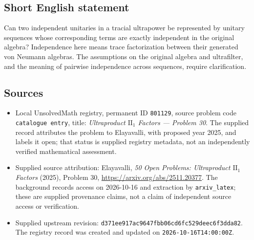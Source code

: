 \documentclass[11pt]{article}
\begin{document}
\subsection{Short English statement}
Can two independent unitaries in a tracial ultrapower be represented by unitary sequences whose corresponding terms are exactly independent in the original algebra? Independence here means trace factorization between their generated von Neumann algebras. The assumptions on the original algebra and ultrafilter, and the meaning of pairwise independence across sequences, require clarification.
\subsection{Sources}
\begin{itemize}
\item Local UnsolvedMath registry, permanent ID \texttt{801129}, source problem code \texttt{catalogue entry}, title: \emph{Ultraproduct $\mathrm{II}_1$ Factors --- Problem 30}. The supplied record attributes the problem to Elayavalli, with proposed year 2025, and labels it open; that status is supplied registry metadata, not an independently verified mathematical assessment.
\item Supplied source attribution: Elayavalli, \emph{50 Open Problems: Ultraproduct $\mathrm{II}_1$ Factors} (2025), Problem 30, \url{https://arxiv.org/abs/2511.20377}. The background records access on 2026-10-16 and extraction by \texttt{arxiv\_latex}; these are supplied provenance claims, not a claim of independent source access or verification.
\item Supplied upstream revision: \texttt{d371ee917ac9647fbb06cd6fc529deec6f3dda82}. The registry record was created and updated on \texttt{2026-10-16T14:00:00Z}.
\end{itemize}
\end{document}
